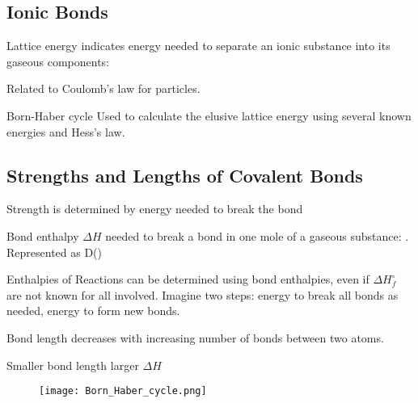 \begin{mdframed}
\begin{multicols}{2}
\subsection{Ionic Bonds}
\begin{compactdesc}
\item[Lattice energy] indicates energy needed to separate an ionic substance
    into its gaseous components: 
\item[Related] to Coulomb's law for particles.
\item[Born-Haber cycle]
    Used to calculate the elusive lattice energy using several known energies
    and Hess's law.
\end{compactdesc}




\subsection{Strengths and Lengths of Covalent Bonds}
\begin{compactdesc}
\item[Strength] is determined by energy needed to break the bond
\item[Bond enthalpy] $\Delta H$ needed to break a bond in one mole of a gaseous
    substance: . Represented as D()
\item[Enthalpies of Reactions] can be determined using bond enthalpies, even
    if $\Delta H_f^\circ$ are not known for all involved.
    Imagine two steps: energy to break all bonds as needed, energy to form new
    bonds.
\item[Bond length] decreases with increasing number of bonds between two atoms.
\item[Smaller bond length] larger $\Delta H$
\end{compactdesc}

\begin{figure}[H]
    \centering
    \texttt{[image: Born\_Haber\_cycle.png]}
\end{figure}

\end{multicols}
\end{mdframed}


